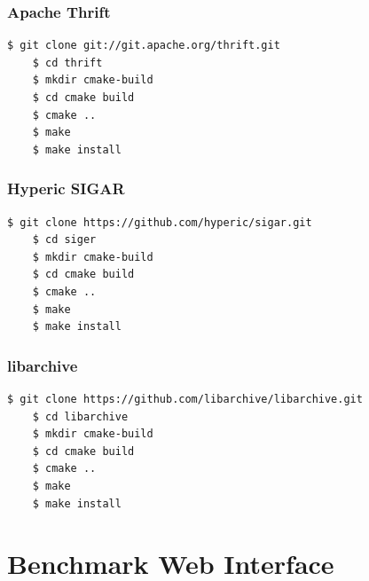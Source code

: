 \documentclass[11pt,a4paper]{article}
\begin{document}
\subsubsection{Apache Thrift}
\begin{lstlisting}[language=bash]
	$ git clone git://git.apache.org/thrift.git
	$ cd thrift
	$ mkdir cmake-build
	$ cd cmake build
	$ cmake ..
	$ make
	$ make install
\end{lstlisting}

\subsubsection{Hyperic SIGAR}
\begin{lstlisting}[language=bash]
	$ git clone https://github.com/hyperic/sigar.git
	$ cd siger
	$ mkdir cmake-build
	$ cd cmake build
	$ cmake ..
	$ make
	$ make install
\end{lstlisting}

\subsubsection{libarchive}
\begin{lstlisting}[language=bash]
	$ git clone https://github.com/libarchive/libarchive.git
	$ cd libarchive
	$ mkdir cmake-build
	$ cd cmake build
	$ cmake ..
	$ make
	$ make install
\end{lstlisting}


\section{Benchmark Web Interface}
\end{document}
